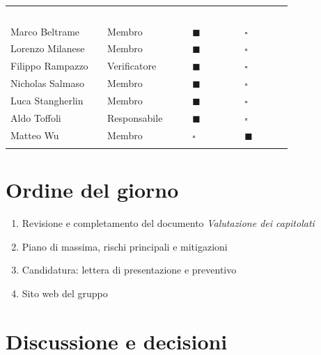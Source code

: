 \documentclass[12pt,a4paper]{article}
\newcommand{\tightlist}{\setlength{\itemsep}{1pt}\setlength{\parskip}{0pt}}
\begin{document}
\begin{center}
\begin{tabularx}{\linewidth}{>{\raggedright\arraybackslash}X>{\centering\arraybackslash}X>{\centering\arraybackslash}p{2.2cm}>{\centering\arraybackslash}p{2.2cm}}
\rowcolor{bfblue}\textcolor{white}{\textbf{Nome e Cognome}} & \textcolor{white}{\textbf{Ruolo Progetto}} & \textcolor{white}{\textbf{Presente}} & \textcolor{white}{\textbf{Assente}} \\
Marco Beltrame & Membro & $\blacksquare$ & $\square$ \\ \arrayrulecolor{bfline}\hline
Lorenzo Milanese & Membro & $\blacksquare$ & $\square$ \\ \arrayrulecolor{bfline}\hline
Filippo Rampazzo & Verificatore & $\blacksquare$ & $\square$ \\ \arrayrulecolor{bfline}\hline
Nicholas Salmaso & Membro & $\blacksquare$ & $\square$ \\ \arrayrulecolor{bfline}\hline
Luca Stangherlin & Membro & $\blacksquare$ & $\square$ \\ \arrayrulecolor{bfline}\hline
Aldo Toffoli & Responsabile & $\blacksquare$ & $\square$ \\ \arrayrulecolor{bfline}\hline
Matteo Wu & Membro & $\square$ & $\blacksquare$ \\ \arrayrulecolor{bfline}\hline
\end{tabularx}
\end{center}

\hypertarget{ordine-del-giorno}{%
\section{Ordine del giorno}}

\begin{enumerate}
\tightlist
\item Revisione e completamento del documento \emph{Valutazione dei capitolati}
\item Piano di massima, rischi principali e mitigazioni
\item Candidatura: lettera di presentazione e preventivo
\item Sito web del gruppo
\end{enumerate}


\newpage
\hypertarget{discussione-e-decisioni}{%
\section{Discussione e decisioni}}
\end{document}
